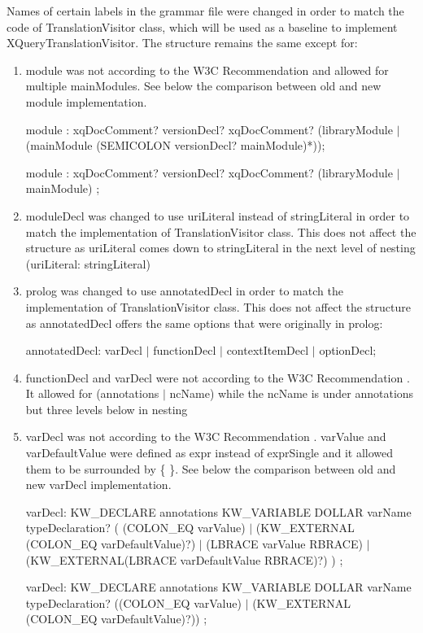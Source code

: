 Names of certain labels in the grammar file were changed in order to match the code of TranslationVisitor class, which will be used as a baseline to implement XQueryTranslationVisitor. The structure remains the same except for:
\begin{enumerate}
	
	\item module was not according to the W3C Recommendation \cite{XQueryRecommendation} and allowed for multiple mainModules. See below the comparison between old and new module implementation.
	
	module : xqDocComment? versionDecl? xqDocComment? (libraryModule $|$ (mainModule (SEMICOLON versionDecl? mainModule)*));
	
	module : xqDocComment? versionDecl? xqDocComment? (libraryModule $|$ mainModule) ;
	\item moduleDecl was changed to use uriLiteral instead of stringLiteral in order to match the implementation of TranslationVisitor class. This does not affect the structure as uriLiteral comes down to stringLiteral in the next level of nesting (uriLiteral: stringLiteral)
	\item prolog was changed to use annotatedDecl in order to match the implementation of TranslationVisitor class. This does not affect the structure as annotatedDecl offers the same options that were originally in prolog:
	
	annotatedDecl: varDecl $|$ functionDecl	$|$ contextItemDecl $|$ optionDecl;
	
	\item functionDecl and varDecl were not according to the W3C Recommendation \cite{XQueryRecommendation}. It allowed for (annotations $|$ ncName) while the ncName is under annotations but three levels below in nesting
 	
	\item varDecl was not according to the W3C Recommendation \cite{XQueryRecommendation}. varValue and varDefaultValue were defined as expr instead of exprSingle and it allowed them to be surrounded by \{ \}. See below the comparison between old and new varDecl implementation.
	
	varDecl: KW\_DECLARE annotations KW\_VARIABLE DOLLAR varName typeDeclaration?
	(
	(COLON\_EQ varValue)
	$|$ (KW\_EXTERNAL (COLON\_EQ varDefaultValue)?)
	$|$ (LBRACE varValue RBRACE)
	$|$ (KW\_EXTERNAL(LBRACE varDefaultValue RBRACE)?)
	) ; 
	
	varDecl: KW\_DECLARE annotations KW\_VARIABLE DOLLAR varName typeDeclaration?
	((COLON\_EQ varValue)
	$|$ (KW\_EXTERNAL (COLON\_EQ varDefaultValue)?)) ;
	

\end{enumerate}
